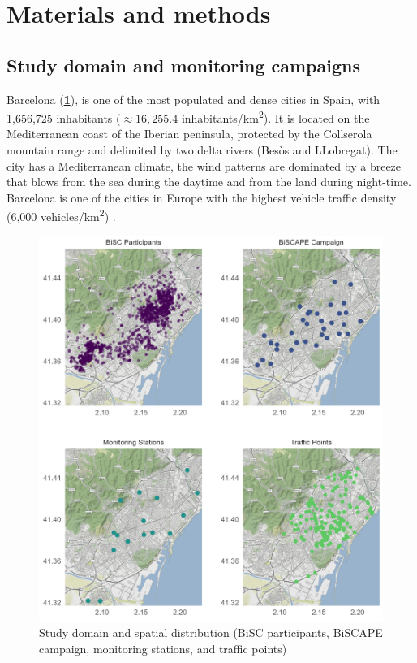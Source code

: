 \documentclass{article}
\begin{document}
\section{Materials and methods}

\subsection{Study domain and monitoring campaigns}

Barcelona (\textbf{\cref{fig1}}), is one of the most populated and dense cities in Spain, with 1,656,725 inhabitants ($\approx16,255.4$ inhabitants/km\textsuperscript{2}). It is located on the Mediterranean coast of the Iberian peninsula, protected by the Collserola mountain range and delimited by two delta rivers (Besòs and LLobregat). The city has a Mediterranean climate, the wind patterns are dominated by a breeze that blows from the sea during the daytime and from the land during night-time. Barcelona is one of the cities in Europe with the highest vehicle traffic density (6,000 vehicles/km\textsuperscript{2}) \cite{casallas2018}. 

\captionsetup[figure]{skip=-4pt}
\begin{figure}[!htb]
\includegraphics[width=1.0\textwidth]{figures/fig1_op2.png}
\caption{Study domain and spatial distribution (BiSC participants, BiSCAPE campaign, monitoring stations, and traffic points)}
\label{fig1}
\end{figure}
\end{document}

